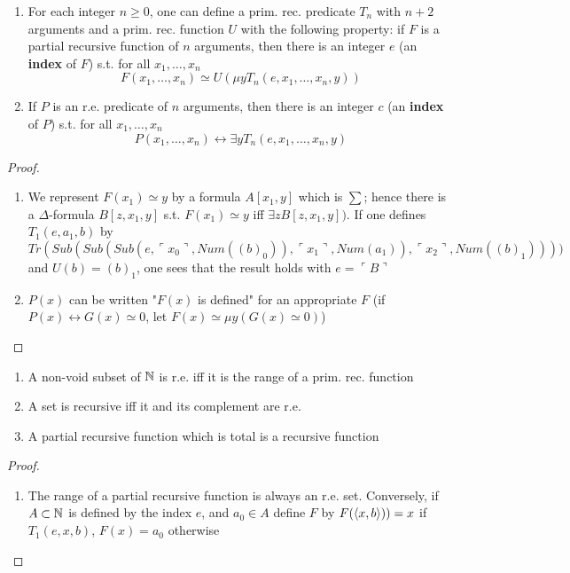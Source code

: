 \documentclass[11pt]{article}
\begin{document}
\begin{theorem}
\begin{enumerate}
\item For each integer \(n\ge 0\), one can define a prim. rec. predicate \(T_n\) with
\(n+2\) arguments and a prim. rec. function \(U\) with the following property: if
\(F\) is a partial recursive function of \(n\) arguments, then there is an
integer \(e\) (an \textbf{index} of \(F\)) s.t. for all \(x_1,\dots,x_n\)
\begin{equation*}
F(x_1,\dots,x_n)\simeq U(\mu yT_n(e,x_1,\dots,x_n,y))
\end{equation*}
\item If \(P\) is an r.e. predicate of \(n\) arguments, then there is an integer \(c\)
(an \textbf{index} of \(P\)) s.t. for all \(x_1,\dots,x_n\)
\begin{equation*}
P(x_1,\dots,x_n)\leftrightarrow\exists yT_n(e,x_1,\dots,x_n,y)
\end{equation*}
\end{enumerate}
\end{theorem}

\begin{proof}
\begin{enumerate}
\item We represent \(F(x_1)\simeq y\) by a formula \(A[x_1,y]\) which is \(\sum\); hence
there is a \(\Delta\)-formula \(B[z,x_1,y]\) s.t. \(F(x_1)\simeq y\) iff \(\exists
   zB[z,x_1,y])\). If one defines \(T_1(e,a_1,b)\) by 
\begin{equation*}
Tr(Sub(Sub(Sub(e,\ulcorner x_0\urcorner, Num((b)_0)),
\ulcorner x_1\urcorner,Num(a_1)),\ulcorner x_2\urcorner,Num((b)_1))))
\end{equation*}
and \(U(b)=(b)_1\), one sees that the result holds with \(e=\ulcorner
   B\urcorner\)
\item \(P(x)\) can be written "\(F(x)\) is defined" for an appropriate \(F\) (if
\(P(x)\leftrightarrow G(x)\simeq 0\), let \(F(x)\simeq\mu y(G(x)\simeq 0)\))
\end{enumerate}
\end{proof}

\begin{corollary}[]
\begin{enumerate}
\item A non-void subset of \(\mathbb{N}\) is r.e. iff it is the range of a prim. rec.
function
\item A set is recursive iff it and its complement are r.e.
\item A partial recursive function which is total is a recursive function
\end{enumerate}
\end{corollary}

\begin{proof}
\begin{enumerate}
\item The range of a partial recursive function is always an r.e. set. Conversely,
if \(A\subset\mathbb{N}\) is defined by the index \(e\), and \(a_0\in A\) define \(F\) by
\(F(\langle x,b\rangle))=x\) if \(T_1(e,x,b)\), \(F(x)=a_0\) otherwise
\end{enumerate}
\end{proof}
\end{document}
